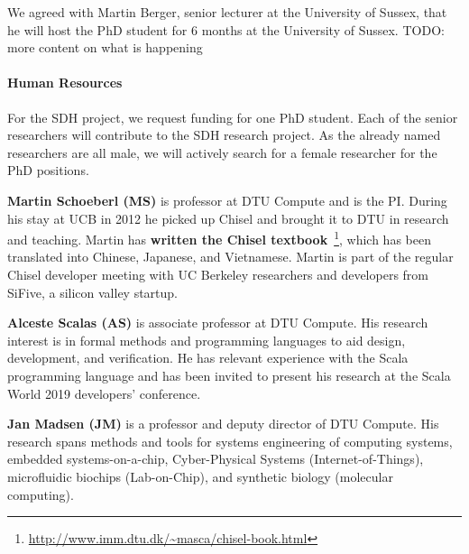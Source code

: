 \documentclass[fleqn,12pt]{article}
\newcommand{\todo}[1]{{\color{red} TODO: #1}}
\begin{document}
We agreed with Martin Berger, senior lecturer at the University of Sussex, that he will host the PhD
student for 6 months at the University of Sussex.
\todo{more content on what is happening}

\paragraph*{Human Resources}

For the SDH project, we request funding for one PhD student.
Each of the senior researchers will contribute to the SDH research project.
%
%
As the already named researchers are all male, we will actively search
for a female researcher for the PhD positions.


{\bf Martin Schoeberl (MS)} is professor at DTU Compute and is the PI.
During his stay
at UCB in 2012 he picked up Chisel and brought it to DTU in research and teaching.
Martin has {\bf written the Chisel textbook}~\cite{chisel:book}\footnote{\url{http://www.imm.dtu.dk/~masca/chisel-book.html}}, which has been translated
into Chinese, Japanese, and Vietnamese.
Martin is part of the regular Chisel developer meeting with
UC Berkeley researchers and developers from SiFive, a silicon valley startup.


{\bf Alceste Scalas (AS)} is associate professor at DTU Compute. His research interest is in formal methods and programming languages to aid design, development, and verification. He has relevant experience with the Scala programming language and has been invited to present his research at the Scala World 2019 developers' conference.

{\bf Jan Madsen (JM)} is a professor and deputy director of DTU Compute.
His research spans methods
and tools for systems engineering of computing systems, embedded systems-on-a-chip,
Cyber-Physical Systems (Internet-of-Things), microfluidic biochips (Lab-on-Chip), and
synthetic biology (molecular computing).
\end{document}
